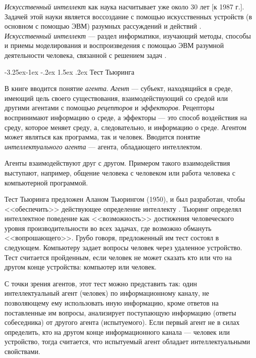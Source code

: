 \documentclass[12pt, openany, twoside]{book} %
\makeatletter
\renewcommand\subsection{\@startsection{subsection}{2}{\z@}%
                                     {-3.25ex\@plus -1ex \@minus -.2ex}%
                                     {1.5ex \@plus .2ex}%
                                     {\normalfont\normalsize\bfseries}}
\makeatother
\begin{document}
{\em Искусственный интеллект} как наука насчитывает уже около 30 лет [к 1987 г.]. Задачей этой науки является воссоздание с помощью искусственных устройств (в основном с помощью ЭВМ) разумных рассуждений и действий \cite{Lauriere}.\\
{\em Искусственный интеллект} --- раздел информатики, изучающий методы, способы и приемы моделирования и воспроизведения с помощью ЭВМ разумной деятельности человека, связанной с решением задач \cite{math_slov:88}.

\subsection{Тест Тьюринга}

В книге \cite{Russell} вводится понятие {\em агента}. {\em Агент} --- субъект, находящийся в среде, имеющий цель своего существования, взаимодействующий со средой или другими агентами с помощью {\em рецепторов} и {\em эффекторов}. Рецепторы воспринимают информацию о среде, а эффекторы --- это способ воздействия на среду, которое меняет среду, а, следовательно, и информацию о среде. Агентом может являться как программа, так и человек. Вводится понятие {\em интеллектуального агента} --- агента, обладающего интеллектом.

Агенты взаимодействуют друг с другом. Примером такого взаимодействия выступают, например, общение человека с человеком или работа человека с компьютерной программой.

Тест Тьюринга предложен Аланом Тьюрингом (1950), и был разработан, чтобы <<обеспечить>> действующее определение интеллекту \cite{Russell}. Тьюринг определял интеллектное поведение как <<возможность>> достижения человеческого уровня производительности во всех задачах, где возможно обмануть <<вопрошающего>>. Грубо говоря, предложенный им тест состоял в следующем. Компьютеру задает вопросы человек через удаленное устройство. Тест считается пройденным, если человек не может сказать кто или что на другом конце устройства: компьютер или человек.

С точки зрения агентов, этот тест можно представить так: один интеллектуальный агент (человек) по информационному каналу, не позволяющему ему использовать иную информацию, кроме ответов на поставленные им вопросы, анализирует поступающую информацию (ответы собеседника) от другого агента (испытуемого). Если первый агент не в силах определить, кто на другом конце информационного канала --- человек или устройство, тогда считается, что испытуемый агент обладает интеллектуальными свойствами.
\end{document}
